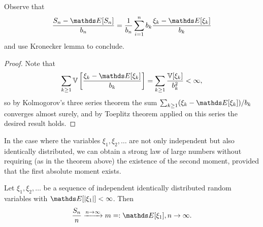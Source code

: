 \begin{hint}
Observe that 
\begin{equation*}
\frac{S_n - \E[S_n]}{b_n} = \frac{1}{b_n} \sum_{i=1}^n b_k \frac{\xi_k - \E[\xi_k]}{b_k}
\end{equation*}
and use Kronecker lemma to conclude.
\end{hint}

\begin{proof}
Note that 
\begin{equation*}
\sum_{k\geq 1} \V\sqbracket{\frac{\xi_k - \E[\xi_k]}{b_k}} = \sum_{k\geq 1} \frac{\V[\xi_k]}{b_k^2} < \infty,
\end{equation*}
so by Kolmogorov's three series theorem the sum $\sum_{k\geq 1} (\xi_k - \E[\xi_k])/b_k$ converges almost surely, and by Toeplitz theorem applied on this series the desired result holds.
\end{proof}

In the case where the variables $\xi_1, \xi_2, \dots$ are not only independent but also identically distributed, we can obtain a strong law of large numbers without requiring (as in the theorem above) the existence of the second moment, provided that the first absolute moment exists.
\begin{theorem}
Let $\xi_1, \xi_2, \dots$ be a sequence of independent identically distributed random variables with $\E[|\xi_1|]<\infty$. Then
\begin{equation*}
    \frac{S_n}{n} \xrightarrow{n\to\infty} m =: \E[\xi_1], n \to \infty.
\end{equation*}
\end{theorem}

